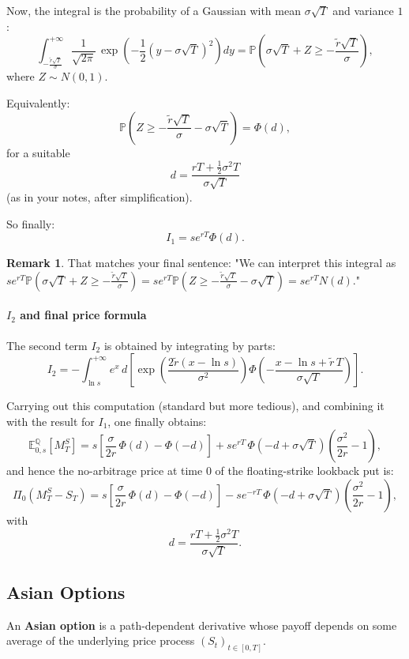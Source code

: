 \documentclass[12pt,a4paper]{article}
\theoremstyle{definition}
\newtheorem{remark}{Remark}[section]
\begin{document}
Now, the integral is the probability of a Gaussian with mean $\sigma\sqrt{T}$ and variance $1$:
\[
\int_{-\frac{\widetilde{r}\sqrt{T}}{\sigma}}^{+\infty} \frac{1}{\sqrt{2\pi}}\, \exp\left(-\frac{1}{2}(y - \sigma\sqrt{T})^2\right) dy = \mathbb{P}\left(\sigma\sqrt{T} + Z \geq -\frac{\widetilde{r}\sqrt{T}}{\sigma}\right),
\]
where $Z \sim N(0,1)$.

Equivalently:
\[
\mathbb{P}\left(Z \geq -\frac{\widetilde{r}\sqrt{T}}{\sigma} - \sigma\sqrt{T}\right) = \Phi(d),
\]
for a suitable
\[
d = \frac{rT + \frac{1}{2}\sigma^2 T}{\sigma\sqrt{T}}
\]
(as in your notes, after simplification).

So finally:
\[
I_1 = s e^{rT} \Phi(d).
\]

\begin{remark}
That matches your final sentence: "We can interpret this integral as $s e^{rT} \mathbb{P}(\sigma\sqrt{T} + Z \geq -\frac{\widetilde{r}\sqrt{T}}{\sigma}) = s e^{rT} \mathbb{P}(Z \geq -\frac{\widetilde{r}\sqrt{T}}{\sigma} - \sigma\sqrt{T}) = s e^{rT} N(d)$."
\end{remark}

\paragraph{$I_2$ and final price formula}

The second term $I_2$ is obtained by integrating by parts:
\[
I_2 = -\int_{\ln s}^{+\infty} e^x\, d\left[\exp\!\left(\frac{2\widetilde{r}(x - \ln s)}{\sigma^2}\right) \Phi\!\left(-\frac{x - \ln s + \widetilde{r}\, T}{\sigma\sqrt{T}}\right)\right].
\]

Carrying out this computation (standard but more tedious), and combining it with the result for $I_1$, one finally obtains:
\[
\mathbb{E}_{0,s}^{\mathbb{Q}}[M_T^S] = s\left[\frac{\sigma}{2r}\, \Phi(d) - \Phi(-d)\right] + s e^{rT}\, \Phi(-d + \sigma\sqrt{T})\left(\frac{\sigma^2}{2r} - 1\right),
\]
and hence the no-arbitrage price at time 0 of the floating-strike lookback put is:
\[
\boxed{
\Pi_0(M_T^S - S_T) = s\left[\frac{\sigma}{2r}\, \Phi(d) - \Phi(-d)\right] - s e^{-rT}\, \Phi(-d + \sigma\sqrt{T})\left(\frac{\sigma^2}{2r} - 1\right),
}
\]
with
\[
d = \frac{rT + \frac{1}{2}\sigma^2 T}{\sigma\sqrt{T}}.
\]

\subsection{Asian Options}

An \textbf{Asian option} is a path-dependent derivative whose payoff depends on some average of the underlying price process $(S_t)_{t \in [0,T]}$.
\end{document}
